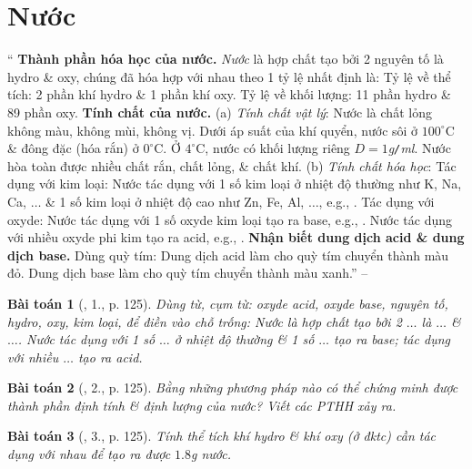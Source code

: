 \documentclass{article}
\newtheorem{baitoan}{Bài toán}
\begin{document}
\section{Nước}
`` \textsf{\textbf{Thành phần hóa học của nước.}} \textit{Nước} là hợp chất tạo bởi 2 nguyên tố là hydro \& oxy, chúng đã hóa hợp với nhau theo 1 tỷ lệ nhất định là: Tỷ lệ về thể tích: 2 phần khí hydro \& 1 phần khí oxy. Tỷ lệ về khối lượng: 11 phần hydro \& 89 phần oxy.  \textsf{\textbf{Tính chất của nước.}} (a) \textit{Tính chất vật lý}: Nước là chất lỏng không màu, không mùi, không vị. Dưới áp suất của khí quyển, nước sôi ở $100^\circ$C \& đông đặc (hóa rắn) ở $0^\circ$C. Ở $4^\circ$C, nước có khối lượng riêng $D = 1$\emph{g\texttt{/}ml}. Nước hòa toàn được nhiều chất rắn, chất lỏng, \& chất khí. (b) \textit{Tính chất hóa học}: Tác dụng với kim loại: Nước tác dụng với 1 số kim loại ở nhiệt độ thường như K, Na, Ca, $\ldots$ \& 1 số kim loại ở nhiệt độ cao như Zn, Fe, Al, $\ldots$, e.g., . Tác dụng với oxyde: Nước tác dụng với 1 số oxyde kim loại tạo ra base, e.g., . Nước tác dụng với nhiều oxyde phi kim tạo ra acid, e.g., .  \textsf{\textbf{Nhận biết dung dịch acid \& dung dịch base.}} Dùng quỳ tím: Dung dịch acid làm cho quỳ tím chuyển thành màu đỏ. Dung dịch base làm cho quỳ tím chuyển thành màu xanh.'' -- \cite[Chap. 5, \S4, pp. 87--88]{Truong_BTNC_Hoa_Hoc_8_2022}

\begin{baitoan}[\cite{SGK_Hoa_Hoc_8}, 1., p. 125]
	Dùng từ, cụm từ: oxyde acid, oxyde base, nguyên tố, hydro, oxy, kim loại, để điền vào chỗ trống: Nước là hợp chất tạo bởi 2 $\ldots$ là $\ldots$ \& $\ldots$. Nước tác dụng với 1 số $\ldots$ ở nhiệt độ thường \& 1 số $\ldots$ tạo ra base; tác dụng với nhiều $\ldots$ tạo ra acid.
\end{baitoan}

\begin{baitoan}[\cite{SGK_Hoa_Hoc_8}, 2., p. 125]
	Bằng những phương pháp nào có thể chứng minh được thành phần định tính \& định lượng của nước? Viết các PTHH xảy ra.
\end{baitoan}

\begin{baitoan}[\cite{SGK_Hoa_Hoc_8}, 3., p. 125]
	Tính thể tích khí hydro \& khí oxy (ở đktc) cần tác dụng với nhau để tạo ra được $1.8$\emph{g} nước.
\end{baitoan}
\end{document}
